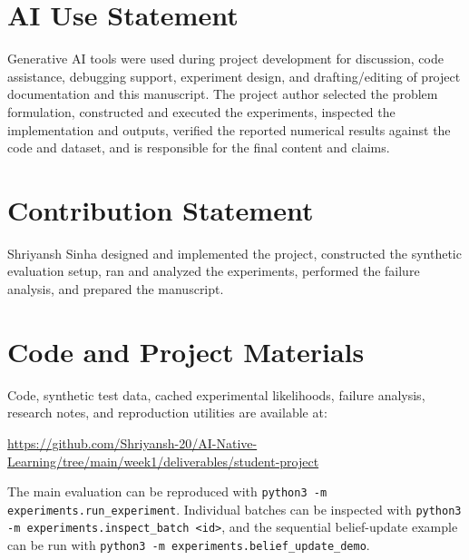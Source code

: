 \documentclass{article}
\begin{document}
\section*{AI Use Statement}

Generative AI tools were used during project development for discussion, code assistance, debugging support, experiment design, and drafting/editing of project documentation and this manuscript. The project author selected the problem formulation, constructed and executed the experiments, inspected the implementation and outputs, verified the reported numerical results against the code and dataset, and is responsible for the final content and claims.


\section*{Contribution Statement}

Shriyansh Sinha designed and implemented the project, constructed the synthetic evaluation setup, ran and analyzed the experiments, performed the failure analysis, and prepared the manuscript.


\section*{Code and Project Materials}

Code, synthetic test data, cached experimental likelihoods, failure analysis, research notes, and reproduction utilities are available at:

\begin{center}
\url{https://github.com/Shriyansh-20/AI-Native-Learning/tree/main/week1/deliverables/student-project}
\end{center}

The main evaluation can be reproduced with
\texttt{python3 -m experiments.run\_experiment}.
Individual batches can be inspected with
\texttt{python3 -m experiments.inspect\_batch <id>},
and the sequential belief-update example can be run with
\texttt{python3 -m experiments.belief\_update\_demo}.




\end{document}
